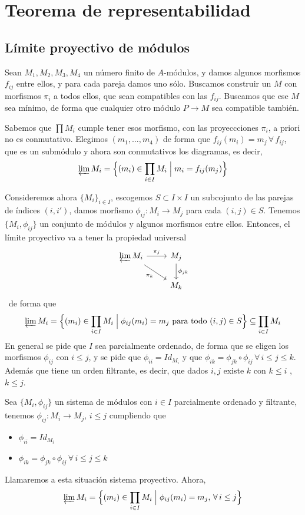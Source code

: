\chapter{Teorema de representabilidad}
\section{L\'imite proyectivo de m\'odulos}
\begin{ejem}
    Sean $M_1,M_2,M_3, M_4$ un n\'umero finito de $A$-m\'odulos, y damos algunos morfismos $f_{ij}$ entre ellos, y para cada pareja damos uno s\'olo. Buscamos construir un $M$ con morfismos $\pi_i$ a todos ellos, que sean compatibles con las $f_{ij}$. Buscamos que ese $M$ sea m\'inimo, de forma que cualquier otro m\'odulo $P \longrightarrow M$ sea compatible tambi\'en. 

    Sabemos que $\prod M_i$ cumple tener esos morfismo, con las proyeccciones $\pi_i$, a priori no es conmutativo. Elegimos $(m_1, \ldots, m_4)$ de forma que $f_{ij}(m_i) = m_j \, \forall \, f_{ij}$, que es un subm\'odulo y ahora son conmutativos los diagramas, es decir,
    $$\displaystyle \varprojlim M_{i}={\Big \{}(m_{i})\in \prod _{i\in I}M_{i}\;{\Big |}\;m_{i}=f_{ij}(m_{j}){\Big \}}$$
\end{ejem}
Consideremos ahora $\{M_i\}_{i \in I}$, escogemos $S \subset I \times I$ un subcojunto de las parejas de \'indices $(i,i')$, damos morfismo $\phi_{ij} : M_i \longrightarrow M_j$ para cada $(i,j)\in S$. Tenemos $\{M_i, \phi_{ij}\}$ un conjunto de m\'odulos y algunos morfismos entre ellos. Entonces, el l\'imite proyectivo va a tener la propiedad universal
$$\bt \varprojlim M_i \rar{\pi_{j}} \arrow[swap]{dr}{\pi_k} & \arrow{d}{\phi_{jk}} M_j \\ & M_k \et$$\
de forma que 
$$\varprojlim M_i  = {\Big \{}(m_{i})\in \prod _{i\in I}M_{i}\;{\Big |}\;\phi_{ij}(m_{i}) = m_j {\mbox{ para todo }}(i,j) \in S{\Big \}} \subseteq \prod _{i\in I}M_{i}$$
En general se pide que $I$ sea parcialmente ordenado, de forma que se eligen los morfismos $\phi_{ij}$ con $i\leq j$, y se pide que $\phi_{ii} = Id_{M_i}$ y que $\phi_{ik} = \phi_{jk} \circ \phi_{ij} \, \forall \, i \leq j \leq k$. Adem\'as que tiene un orden filtrante, es decir, que dados $i,j$ existe $k$ con $k\leq i$ , $k \leq j$. 
\begin{defi}
    Sea $\{M_i, \phi_{ij}\}$ un sistema de m\'odulos con $i \in I$ parcialmente ordenado y filtrante, tenemos $\phi_{ij} : M_i \longrightarrow M_j, \, i \leq j$ cumpliendo que 
    \begin{itemize}
        \item $\phi_{ii} = Id_{M_i}$
        \item $\phi_{ik} = \phi_{jk} \circ \phi_{ij} \, \forall \, i \leq j \leq k$
    \end{itemize}
    Llamaremos a esta situaci\'on sistema proyectivo. Ahora, 
    $$\displaystyle \varprojlim M_{i}=\Big\{ (m_{i})\in \prod _{i\in I}M_{i}\;{\Big |}\;\phi_{ij}(m_{i}) = m_j , \, \forall \, i \leq j\Big\}$$
\end{defi}
